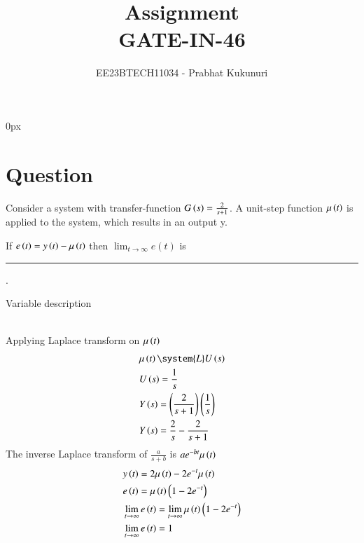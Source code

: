 \documentclass[journal,12pt,twocolumn]{IEEEtran}
\theoremstyle{remark}
\begin{document}
\parindent 0px


\vspace{3cm}

\title{Assignment\\[1ex]GATE-IN-46}
\author{EE23BTECH11034 - Prabhat Kukunuri$^{}$%
}
\maketitle
\newpage
\bigskip

\renewcommand{\thefigure}{\theenumi}
\renewcommand{\thetable}{\theenumi}
\section{Question}
Consider a system with transfer-function $G\left(s\right)=\frac{2}{s+1}$. A unit-step function $\mu\left(t\right)$ is applied to the system, which results in an output y. 

If $e\left(t\right)=y\left(t\right)-\mu\left(t\right)$ then $ \lim_{t\to\infty} e(t)$ is\rule{1.5cm}{0.15mm}.

\solution
\fi
\begin{table}[h]
    \centering
    
    \caption{Variable description}
    \label{tab:GATE.2021.IN.46.1}
\end{table}\\
Applying Laplace transform on $\mu\left(t\right)$
\begin{align}
    &\mu\brak{t}\system{L}U\brak{s}\\
    &U\brak{s}=\frac{1}{s}\\
    &Y\brak{s}=\brak{\frac{2}{s+1}}\brak{\frac{1}{s}}\\
    &Y\brak{s}=\frac{2}{s}-\frac{2}{s+1}
\end{align}
The inverse Laplace transform of $\frac{a}{s+b}$ is $ae^{-bt}\mu\left(t\right)$
\begin{align}
    &y\left(t\right)=2\mu\left(t\right)-2e^{-t}\mu\left(t\right)\\
    &e\left(t\right)=\mu\left(t\right)\left(1-2e^{-t}\right)\\
    &\lim_{t\to\infty}e\left(t\right)=\lim_{t\to\infty}\mu\left(t\right)\left(1-2e^{-t}\right)\\
    &\lim_{t\to\infty}e\left(t\right)=1
\end{align}
\end{document}
